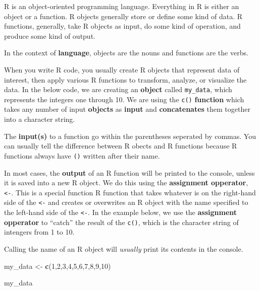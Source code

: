 \documentclass[
]{book}
\newenvironment{Shaded}{\begin{snugshade}}{\end{snugshade}}
\newcommand{\DecValTok}[1]{\textcolor[rgb]{0.00,0.00,0.81}{#1}}
\newcommand{\FunctionTok}[1]{\textcolor[rgb]{0.13,0.29,0.53}{\textbf{#1}}}
\newcommand{\NormalTok}[1]{#1}
\newcommand{\OtherTok}[1]{\textcolor[rgb]{0.56,0.35,0.01}{#1}}
\begin{document}
R is an object-oriented programming language. Everything in R is either an object or a function. R objects generally store or define some kind of data. R functions, generally, take R objects as input, do some kind of operation, and produce some kind of output.

In the context of \textbf{language}, objects are the nouns and functions are the verbs.

When you write R code, you usually create R objects that represent data of interest, then apply various R functions to transform, analyze, or visualize the data. In the below code, we are creating an \textbf{object} called \texttt{my\_data}, which represents the integers one through 10. We are using the \texttt{c()} \textbf{function} which takes any number of input \textbf{objects} as \textbf{input} and \textbf{concatenates} them together into a character string.

The \textbf{input(s)} to a function go within the parentheses seperated by commas. You can usually tell the difference between R obects and R functions because R functions always have \texttt{()} written after their name.

In most cases, the \textbf{output} of an R function will be printed to the console, unless it is saved into a new R object. We do this using the \textbf{assignment opperator}, \texttt{\textless{}-}. This is a special function R function that takes whatever is on the right-hand side of the \texttt{\textless{}-} and creates or overwrites an R object with the name specified to the left-hand side of the \texttt{\textless{}-}. In the example below, we use the \textbf{assignment opperator} to ``catch'' the result of the \texttt{c()}, which is the character string of intengers from 1 to 10.

Calling the name of an R object will \emph{usually} print its contents in the console.

\begin{Shaded}
\begin{Highlighting}[]
\NormalTok{my\_data }\OtherTok{\textless{}{-}} \FunctionTok{c}\NormalTok{(}\DecValTok{1}\NormalTok{,}\DecValTok{2}\NormalTok{,}\DecValTok{3}\NormalTok{,}\DecValTok{4}\NormalTok{,}\DecValTok{5}\NormalTok{,}\DecValTok{6}\NormalTok{,}\DecValTok{7}\NormalTok{,}\DecValTok{8}\NormalTok{,}\DecValTok{9}\NormalTok{,}\DecValTok{10}\NormalTok{)}



\NormalTok{my\_data}
\end{Highlighting}
\end{Shaded}
\end{document}
